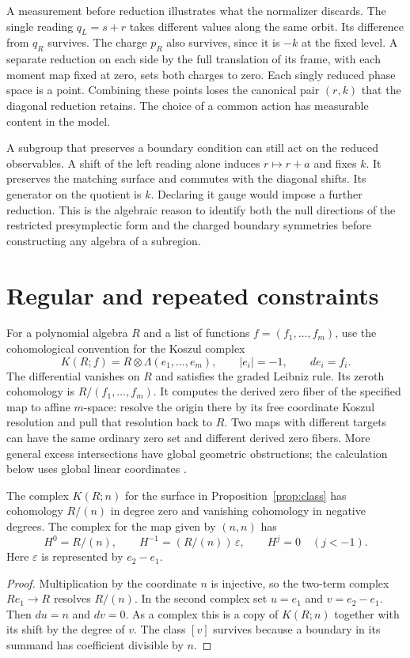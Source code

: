 \documentclass[11pt,letterpaper]{article}
\begin{document}
A measurement before reduction illustrates what the normalizer discards. The single reading
$q_L=s+r$ takes different values along the same orbit. Its difference from $q_R$ survives. The
charge $p_R$ also survives, since it is $-k$ at the fixed level. A separate reduction on each
side by the full translation of its frame, with each moment map fixed at zero, sets both
charges to zero. Each singly reduced phase space is a point. Combining these points loses the
canonical pair $(r,k)$ that the diagonal reduction retains. The choice of a common action has
measurable content in the model.

A subgroup that preserves a boundary condition can still act on the reduced observables. A
shift of the left reading alone induces $r\mapsto r+a$ and fixes $k$. It preserves the
matching surface and commutes with the diagonal shifts. Its generator on the quotient is $k$.
Declaring it gauge would impose a further reduction. This is the algebraic reason to identify
both the null directions of the restricted presymplectic form and the charged boundary
symmetries before constructing any algebra of a subregion.

\section{Regular and repeated constraints}
For a polynomial algebra $R$ and a list of functions $f=(f_1,\ldots,f_m)$, use the
cohomological convention for the Koszul complex
\[
 K(R;f)=R\otimes\Lambda(e_1,\ldots,e_m),\qquad |e_i|=-1,\qquad de_i=f_i .
\]
The differential vanishes on $R$ and satisfies the graded Leibniz rule. Its zeroth cohomology
is $R/(f_1,\ldots,f_m)$. It computes the derived zero fiber of the specified map to affine
$m$-space: resolve the origin there by its free coordinate Koszul resolution and pull that
resolution back to $R$. Two maps with different targets can have the same ordinary zero set
and different derived zero fibers. More general excess intersections have global geometric
obstructions; the calculation below uses global linear coordinates \cite{derived}.

\begin{proposition}\label{prop:excess}
The complex $K(R;n)$ for the surface in Proposition~\ref{prop:class} has cohomology $R/(n)$ in
degree zero and vanishing cohomology in negative degrees. The complex for the map given by
$(n,n)$ has
\[
 H^0=R/(n),\qquad H^{-1}=(R/(n))\,\varepsilon,\qquad
 H^j=0\quad(j<-1).
\]
Here $\varepsilon$ is represented by $e_2-e_1$.
\end{proposition}
\begin{proof}
Multiplication by the coordinate $n$ is injective, so the two-term complex $R e_1\to R$
resolves $R/(n)$. In the second complex set $u=e_1$ and $v=e_2-e_1$. Then $du=n$ and $dv=0$.
As a complex this is a copy of $K(R;n)$ together with its shift by the degree of $v$. The
class $[v]$ survives because a boundary in its summand has coefficient divisible by $n$.
\end{proof}
\end{document}

